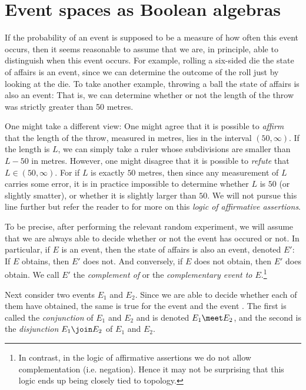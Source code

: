 \documentclass[article, a4paper, 11pt, oneside]{memoir}
\numberwithin{equation}{chapter}
\begin{document}
\chapter{Event spaces as Boolean algebras}

If the probability of an event is supposed to be a measure of how often this event occurs, then it seems reasonable to assume that we are, in principle, able to distinguish when this event occurs. For example, rolling a six-sided die the state of affairs  is an event, since we can determine the outcome of the roll just by looking at the die. To take another example, throwing a ball the state of affairs  is also an event: That is, we can determine whether or not the length of the throw was strictly greater than 50 metres.

One might take a different view: One might agree that it is possible to \emph{affirm} that the length of the throw, measured in metres, lies in the interval $(50,\infty)$. If the length is $L$, we can simply take a ruler whose subdivisions are smaller than $L - 50$ in metres. However, one might disagree that it is possible to \emph{refute} that $L \in (50, \infty)$. For if $L$ is exactly $50$ metres, then since any measurement of $L$ carries some error, it is in practice impossible to determine whether $L$ is $50$ (or slightly smatter), or whether it is slightly larger than $50$. We will not pursue this line further but refer the reader to \textcite{vickers1989} for more on this \emph{logic of affirmative assertions}.

To be precise, after performing the relevant random experiment, we will assume that we are always able to decide whether or not the event has occured or not. In particular, if $E$ is an event, then the state of affairs  is also an event, denoted $E'$: If $E$ obtains, then $E'$ does not. And conversely, if $E$ does not obtain, then $E'$ does obtain. We call $E'$ the \emph{complement of} or the \emph{complementary event to $E$}.\footnote{In contrast, in the logic of affirmative assertions we do not allow complementation (i.e. negation). Hence it may not be surprising that this logic ends up being closely tied to topology.}

Next consider two events $E_1$ and $E_2$. Since we are able to decide whether each of them have obtained, the same is true for the event  and the event . The first is called the \emph{conjunction} of $E_1$ and $E_2$ and is denoted $E_1 \meet E_2$, and the second is the \emph{disjunction} $E_1 \join E_2$ of $E_1$ and $E_2$.
\end{document}
